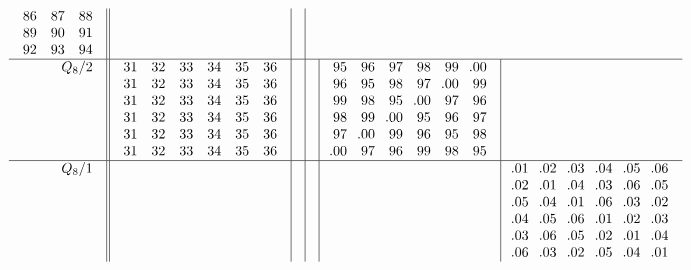 \documentclass[12pt,a4paper]{amsart}
\begin{document}
\begin{align*}
\begin{array}{r||c|c|c|c|c}
\begin{array}{ccc}
      86&87&88\\
      89&90&91\\
      92&93&94\\
    \end{array}
&& \\ \hline
    \begin{array}{r}
      Q_8/2 \\ \\ \\ \\ \\ \\
    \end{array}
&
  \begin{array}{cccccc}
31&32&33&34&35&36\\
31&32&33&34&35&36\\
31&32&33&34&35&36\\
31&32&33&34&35&36\\
31&32&33&34&35&36\\
31&32&33&34&35&36\\
  \end{array}
&&&
  \begin{array}{cccccc}
95&96&97&98&99&\llap.00\\
96&95&98&97&\llap.00&99\\
99&98&95&\llap.00&97&96\\
98&99&\llap.00&95&96&97\\
97&\llap.00&99&96&95&98\\
\llap.00&97&96&99&98&95\\
  \end{array}
& \\ \hline
    \begin{array}{r}
      Q_8/1 \\ \\ \\ \\ \\ \\
    \end{array}
&&&&&
      \begin{array}{cccccc}
\llap.01&\llap.02&\llap.03&\llap.04&\llap.05&\llap.06\\
\llap.02&\llap.01&\llap.04&\llap.03&\llap.06&\llap.05\\
\llap.05&\llap.04&\llap.01&\llap.06&\llap.03&\llap.02\\
\llap.04&\llap.05&\llap.06&\llap.01&\llap.02&\llap.03\\
\llap.03&\llap.06&\llap.05&\llap.02&\llap.01&\llap.04\\
\llap.06&\llap.03&\llap.02&\llap.05&\llap.04&\llap.01\\
      \end{array}
  \end{array}
\end{align*}
\end{document}
